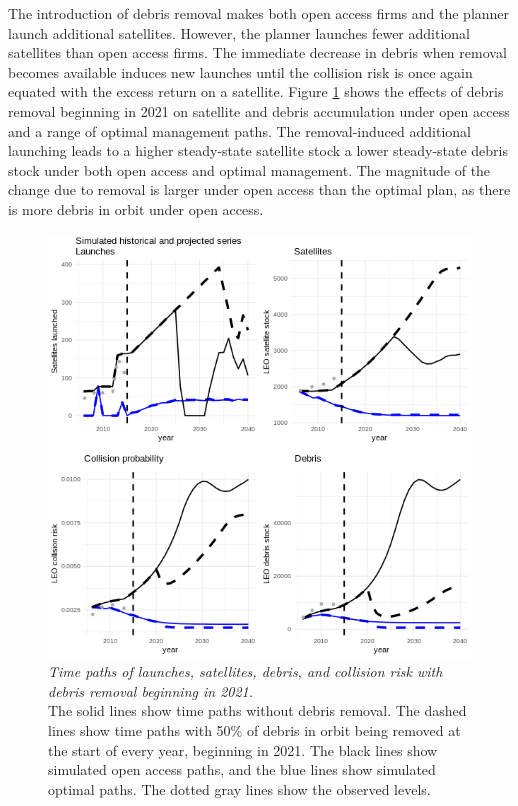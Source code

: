\documentclass[12pt]{article}
\begin{document}
The introduction of debris removal makes both open access firms and the planner launch additional satellites. However, the planner launches fewer additional satellites than open access firms. The immediate decrease in debris when removal becomes available induces new launches until the collision risk is once again equated with the excess return on a satellite. Figure \ref{removal_intro} shows the effects of debris removal beginning in 2021 on satellite and debris accumulation under open access and a range of optimal management paths. The removal-induced additional launching leads to a higher steady-state satellite stock a lower steady-state debris stock under both open access and optimal management. The magnitude of the change due to removal is larger under open access than the optimal plan, as there is more debris in orbit under open access.

\begin{figure}[H]
	\centering
	\includegraphics[width=\textwidth]{../../images/remcomp7_starts_simulated_projected_series_optstart_2006_remfrac_05_remstart_2021.png}
	\captionsetup{format=hang}
	\caption[Satellite and debris paths with debris removal in 2021]{\textit{Time paths of launches, satellites, debris, and collision risk with debris removal beginning in 2021.} \\
		The solid lines show time paths without debris removal. The dashed lines show time paths with 50\% of debris in orbit being removed at the start of every year, beginning in 2021. The black lines show simulated open access paths, and the blue lines show simulated optimal paths. The dotted gray lines show the observed levels. \\
	}
	\label{removal_intro}
\end{figure}
\end{document}
